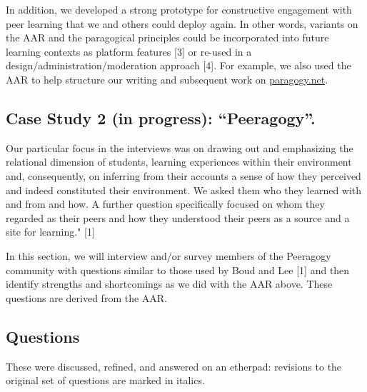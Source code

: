 In addition, we developed a strong prototype for constructive engagement
with peer learning that we and others could deploy again. In other
words, variants on the AAR and the paragogical principles could be
incorporated into future learning contexts as platform features {[}3{]}
or re-used in a design/administration/moderation approach {[}4{]}. For
example, we also used the AAR to help structure our writing and
subsequent work on \href{http://paragogy.net}{paragogy.net}.

\subsection{Case Study 2 (in progress): ``Peeragogy''.}

Our particular focus in the interviews was on drawing out and
emphasizing the relational dimension of students, learning experiences
within their environment and, consequently, on inferring from their
accounts a sense of how they perceived and indeed constituted their
environment. We asked them who they learned with and from and how. A
further question specifically focused on whom they regarded as their
peers and how they understood their peers as a source and a site for
learning." {[}1{]}

In this section, we will interview and/or survey members of the
Peeragogy community with questions similar to those used by Boud and Lee
{[}1{]} and then identify strengths and shortcomings as we did with the
AAR above. These questions are derived from the AAR.

\subsection{Questions}

These were discussed, refined, and answered on an etherpad: revisions to
the original set of questions are marked in italics.

